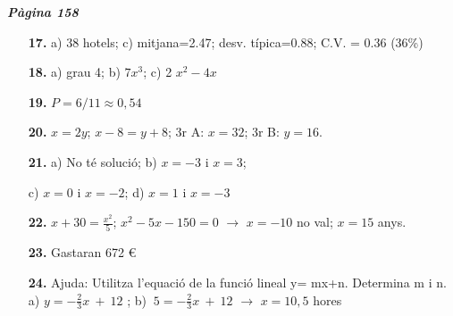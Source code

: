 \documentclass[a4paper, pdf, twoside]{book}
\begin{document}
\begin{multicols}{2}

{\textbf{\em Pàgina 158}} \hrulefill
\begin{enumerate}
\vspace{0.25cm}
\item[\fontfamily{phv}\selectfont\color{blue}\textbf{17. }]  \scalebox{0.6}{\simbolclau } 
 a) 38 hotels; c) mitjana=2.47; desv. típica=0.88; C.V. = 0.36 (36\%)
 \end{enumerate}
\begin{enumerate}
\vspace{0.25cm}
\item[\fontfamily{phv}\selectfont\color{blue}\textbf{18. }]  \scalebox{0.6}{\simbolclau } 
 a) grau 4; \quad b) $7x^{3}$; \quad c) 2 $x^{2}-4x$
\vspace{0.25cm}
\item[\fontfamily{phv}\selectfont\color{blue}\textbf{19. }]  \scalebox{0.6}{\simbolclau } 
 $P=6/11 \approx 0,54$
\vspace{0.25cm}
\item[\fontfamily{phv}\selectfont\color{blue}\textbf{20. }]  \scalebox{0.6}{\simbolclau } 
 $x=2y$; $x -8 = y+8$; \quad 3r A: $x= 32$; \quad 3r B: $y=16$.
\vspace{0.25cm}
\item[\fontfamily{phv}\selectfont\color{blue}\textbf{21. }]  \scalebox{0.6}{\simbolclau } 
 a) No té solució; \quad b) $x=-3$ i $x=3$; \par c) $x=0$ i $x=-2$; \quad d) $x=1$ i $x=-3$
\vspace{0.25cm}
\item[\fontfamily{phv}\selectfont\color{blue}\textbf{22. }]  \scalebox{0.6}{\simbolclau } 
 $x+30=\frac {x^2}{5}$; $x^2-5x-150=0$ $\rightarrow $ $x=-10$ no val; $x=15$ anys.
\vspace{0.25cm}
\item[\fontfamily{phv}\selectfont\color{blue}\textbf{23. }]  \scalebox{0.6}{\simbolclau } 
 Gastaran 672 \euro {} 
\vspace{0.25cm}
\item[\fontfamily{phv}\selectfont\color{blue}\textbf{24. }]  \scalebox{0.6}{\simbolclau } 
Ajuda: Utilitza l'equació de la funció lineal y= mx+n. Determina m i n. a) $y=-\frac {2}{3}x\ +\ 12$ ; \quad b) $\ 5=-\frac {2}{3}x\ +\ 12$ $\rightarrow $ $x=10,5$ hores
 \end{enumerate}
\vspace{0.3cm}



\end{multicols}
\end{document}

